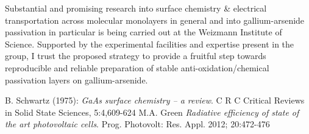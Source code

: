 \documentclass[a4paper]{article}
\begin{document}
Substantial and promising research into surface chemistry \& electrical transportation across molecular monolayers in general and into gallium-arsenide passivation in particular is being carried out at the Weizmann Institute of Science. Supported by the experimental facilities and expertise present in the group, I trust the proposed strategy to provide a fruitful step towards reproducible and reliable preparation of stable anti-oxidation/chemical passivation layers on gallium-arsenide.

\newpage
{}
\begin{thebibliography}{9}
	B. Schwartz (1975): 
	\emph{GaAs surface chemistry – a review}.
	C R C Critical Reviews in Solid State Sciences, 5:4,{609-624}
	M.A. Green
	\emph{Radiative efficiency of state of the art photovoltaic cells}.
	Prog. Photovolt: Res. Appl. 2012; 20:{472-476}


\end{thebibliography}
\end{document}
